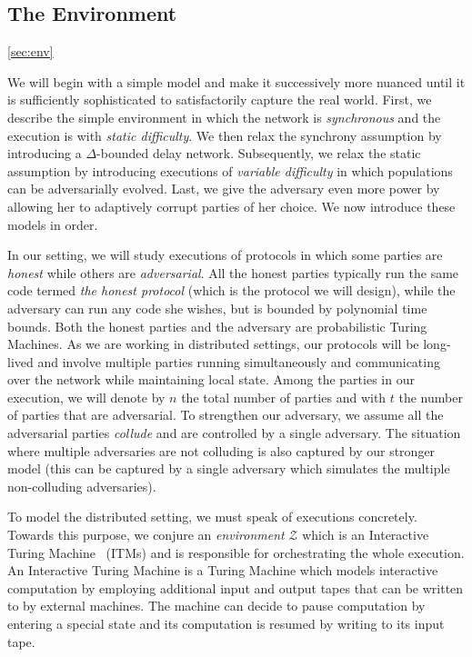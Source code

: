 \subsection{The Environment}\ref{sec:env}

We will begin with a simple model and make it successively more nuanced until it
is sufficiently sophisticated to satisfactorily capture the real world. First,
we describe the simple environment in which the network is \emph{synchronous}
and the execution is with \emph{static difficulty}. We then relax the synchrony
assumption by introducing a $\Delta$-bounded delay network. Subsequently, we
relax the static assumption by introducing executions of
\emph{variable difficulty} in which populations can be adversarially evolved.
Last, we give the adversary even more power by allowing her to adaptively
corrupt parties of her choice. We now introduce these models in order.

In our setting, we will study executions of protocols in which some parties
are \emph{honest} while others are \emph{adversarial}. All the honest parties
typically run the same code termed \emph{the honest protocol} (which is the
protocol we will design), while the adversary can run any code she wishes, but
is bounded by polynomial time bounds. Both the honest parties and the adversary
are probabilistic Turing Machines. As we are working in distributed settings,
our protocols will be long-lived and involve multiple parties running
simultaneously and communicating over the network while maintaining local state.
Among the parties in our execution, we will denote by $n$ the total number of
parties and with $t$ the number of parties that are adversarial. To strengthen
our adversary, we assume all the adversarial parties \emph{collude} and are
controlled by a single adversary. The situation where multiple adversaries are
not colluding is also captured by our stronger model (this can be captured by a
single adversary which simulates the multiple non-colluding adversaries).

To model the distributed setting, we must speak of executions concretely.
Towards this purpose, we conjure an \emph{environment} $\mathcal{Z}$
 which is an
Interactive Turing Machine~\cite{interactive-tm} (ITMs)  and is responsible for
orchestrating the whole execution. An Interactive Turing Machine is a Turing
Machine which models interactive computation by employing additional input and
output tapes that can be written to by external machines. The machine can decide
to pause computation by entering a special state and its computation is resumed
by writing to its input tape.

